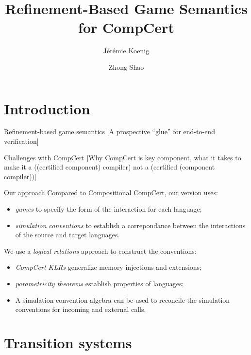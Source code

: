 \documentclass{beamer}
\title{Refinement-Based Game Semantics for CompCert}
\author{\underline{J\'er\'emie Koenig} \and Zhong Shao}
\begin{document}
\maketitle

\section{Introduction} %

\begin{frame}{Refinement-based game semantics} %
[A prospective ``glue'' for end-to-end verification]
\end{frame}

\begin{frame}{Challenges with CompCert} %
[Why CompCert is key component,
what it takes to
make it a ((certified component) compiler) not a
(certified (component compiler))]
\end{frame}

\begin{frame}{Our approach} %
Compared to Compositional CompCert,
our version uses:
\begin{itemize}
\item \emph{games} to specify
  the form of the interaction
  for each language;
\item \emph{simulation conventions} to
  establish a correpondance between the
  interactions of the source and target languages.
\end{itemize}

\vspace{1ex}
We use a \emph{logical relations} approach
to construct the conventions:
\begin{itemize}
\item \emph{CompCert KLRs} generalize memory injections and extensions;
\item \emph{parametricity theorems}
  establish properties of languages;
\item A simulation convention algebra
  can be used to reconcile the simulation conventions for
  incoming and external calls.
\end{itemize}
\end{frame}


\section{Transition systems} %
\end{document}
